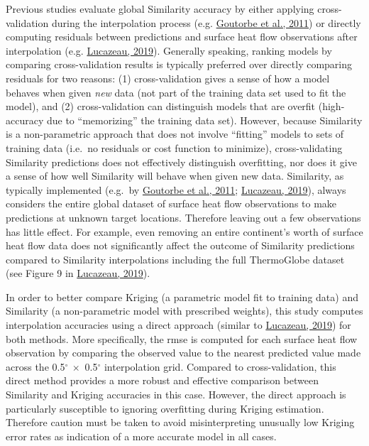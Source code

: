 Previous studies evaluate global Similarity accuracy by either applying cross-validation during the interpolation process (e.g. \protect\hyperlink{ref-goutorbe2011}{Goutorbe et al., 2011}) or directly computing residuals between predictions and surface heat flow observations after interpolation (e.g. \protect\hyperlink{ref-lucazeau2019}{Lucazeau, 2019}). Generally speaking, ranking models by comparing cross-validation results is typically preferred over directly comparing residuals for two reasons: (1) cross-validation gives a sense of how a model behaves when given \emph{new} data (not part of the training data set used to fit the model), and (2) cross-validation can distinguish models that are overfit (high-accuracy due to ``memorizing'' the training data set). However, because Similarity is a non-parametric approach that does not involve ``fitting'' models to sets of training data (i.e.~no residuals or cost function to minimize), cross-validating Similarity predictions does not effectively distinguish overfitting, nor does it give a sense of how well Similarity will behave when given new data. Similarity, as typically implemented (e.g.~by \protect\hyperlink{ref-goutorbe2011}{Goutorbe et al., 2011}; \protect\hyperlink{ref-lucazeau2019}{Lucazeau, 2019}), always considers the entire global dataset of surface heat flow observations to make predictions at unknown target locations. Therefore leaving out a few observations has little effect. For example, even removing an entire continent's worth of surface heat flow data does not significantly affect the outcome of Similarity predictions compared to Similarity interpolations including the full ThermoGlobe dataset (see Figure 9 in \protect\hyperlink{ref-lucazeau2019}{Lucazeau, 2019}).

In order to better compare Kriging (a parametric model fit to training data) and Similarity (a non-parametric model with prescribed weights), this study computes interpolation accuracies using a direct approach (similar to \protect\hyperlink{ref-lucazeau2019}{Lucazeau, 2019}) for both methods. More specifically, the \gls{rmse} is computed for each surface heat flow observation by comparing the observed value to the nearest predicted value made across the 0.5\(^\circ\ \times\) 0.5\(^\circ\) interpolation grid. Compared to cross-validation, this direct method provides a more robust and effective comparison between Similarity and Kriging accuracies in this case. However, the direct approach is particularly susceptible to ignoring overfitting during Kriging estimation. Therefore caution must be taken to avoid misinterpreting unusually low Kriging error rates as indication of a more accurate model in all cases.

